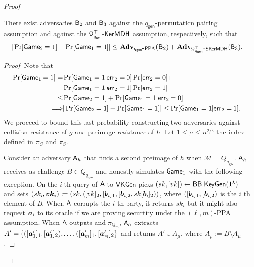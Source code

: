 \begin{proof}
\begin{lemma} There exist adversaries $\mathsf{B}_2$ and $\mathsf{B}_3$ against the ${q_\mathsf{gen}}$-permutation pairing assumption and against the $\mathcal{Q}^\top_{{q_\mathsf{gen}}}\mbox{-}\mathsf{KerMDH}$ assumption, respectively, such that
$$
|\Pr[\mathsf{Game}_2=1]-\Pr[\mathsf{Game}_1=1]|\leq \mathbf{Adv}_{{q_\mathsf{gen}}\mbox{-}\mathrm{PPA}}(\mathsf{B}_2)+\mathbf{Adv}_{\mathcal{Q}^\top_{{q_\mathsf{gen}}}\mbox{-}\mathsf{SKerMDH}}(\mathsf{B}_3).
$$
\end{lemma}
\begin{proof}
Note that
\begin{align*}
\Pr[\mathsf{Game}_1=1]
 = &\Pr[\mathsf{Game}_1=1|\mathsf{err}_2=0]\Pr[\mathsf{err}_2=0]+\\
&\Pr[\mathsf{Game}_1=1|\mathsf{err}_2=1]\Pr[\mathsf{err}_2=1]\\
 \leq& \Pr[\mathsf{Game}_2=1] + \Pr[\mathsf{Game}_1=1|\mathsf{err}_2=0]\\
\Longrightarrow  &|\Pr[\mathsf{Game}_2=1]-\Pr[\mathsf{Game}_1=1]|\leq \Pr[\mathsf{Game}_1=1|\mathsf{err}_2=1].
\end{align*}
We proceed to bound this last probability constructing two adversaries against collision resistance of $g$ and preimage resistance of $h$. Let $1\leq \mu\leq n^{2/3}$ the index defined in $\pi_G$ and $\pi_S$.

Consider an adversary $\mathsf{A}_h$ that finds a second preimage of $h$ when $\mathcal{M}=Q_{q_\mathsf{gen}}$. $\mathsf{A}_h$ receives as challenge $B\in Q_{q_\mathsf{gen}}$ and honestly simulates $\mathsf{Game}_1$ with the following exception. On the $i$ th query of $\mathsf{A}$ to $\mathsf{VKGen}$ picks $(sk,[vk])\gets\mathsf{BB}.\mathsf{KeyGen}(1^\lambda)$ and sets $(sk_i,{\boldsymbol{vk}}_i):=(sk,([vk]_2,[{\boldsymbol{b}}_i]_1,[{\boldsymbol{b}}_i]_2,sk[{\boldsymbol{b}}_i]_2))$, where $([{\boldsymbol{b}}_i]_1,[{\boldsymbol{b}}_i]_2)$ is the $i$ th element of $B$. When $\mathsf{A}$ corrupts the $i$ th party, it returns $sk_i$ but it might also request ${\boldsymbol{a}}_i$ to its oracle if we are proving securtity under the $(\ell,m)$-PPA assumption. When $\mathsf{A}$ outputs and $\pi_{Q_m}$, $\mathsf{A}_h$ extracts $A'=\{([{\boldsymbol{a}}'_1]_1,[{\boldsymbol{a}}'_1]_2),\ldots,([{\boldsymbol{a}}'_m]_1,[{\boldsymbol{a}}'_m]_2\}$ and returns $A'\cup \bar{A}_\mu$, where $\bar{A}_\mu:= B\setminus A_\mu$.


\end{proof}
\end{proof}
